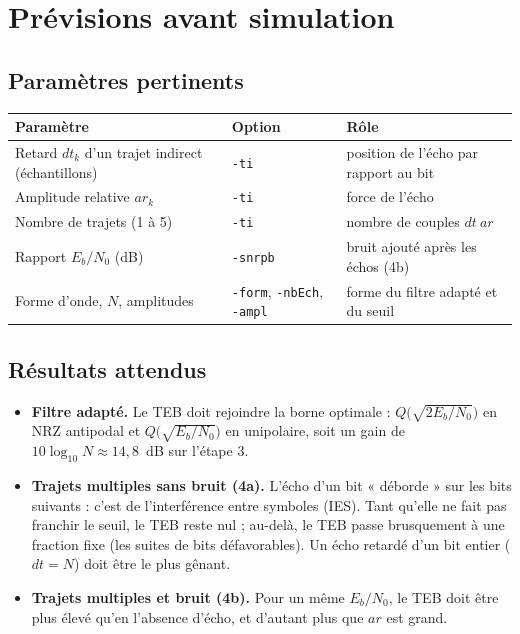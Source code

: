 \documentclass[11pt,a4paper]{article}
\newcommand{\EbNo}{E_b/N_0}
\begin{document}
\section{Prévisions avant simulation}
\subsection{Paramètres pertinents}
\begin{center}\begin{tabular}{lll}\toprule
Paramètre & Option & Rôle\\\midrule
Retard $dt_k$ d'un trajet indirect (échantillons) & \texttt{-ti} & position de l'écho par rapport au bit\\
Amplitude relative $ar_k$ & \texttt{-ti} & force de l'écho\\
Nombre de trajets (1 à 5) & \texttt{-ti} & nombre de couples $dt\ ar$\\
Rapport $\EbNo$ (dB) & \texttt{-snrpb} & bruit ajouté après les échos (4b)\\
Forme d'onde, $N$, amplitudes & \texttt{-form}, \texttt{-nbEch}, \texttt{-ampl} & forme du filtre adapté et du seuil\\\bottomrule
\end{tabular}\end{center}

\subsection{Résultats attendus}
\begin{itemize}
  \item \textbf{Filtre adapté.} Le TEB doit rejoindre la borne optimale : $Q\big(\sqrt{2\EbNo}\big)$ en NRZ antipodal et $Q\big(\sqrt{\EbNo}\big)$ en unipolaire, soit un gain de $10\log_{10}N \approx 14{,}8$~dB sur l'étape 3.
  \item \textbf{Trajets multiples sans bruit (4a).} L'écho d'un bit « déborde » sur les bits suivants : c'est de l'interférence entre symboles (IES). Tant qu'elle ne fait pas franchir le seuil, le TEB reste nul ; au-delà, le TEB passe brusquement à une fraction fixe (les suites de bits défavorables). Un écho retardé d'un bit entier ($dt = N$) doit être le plus gênant.
  \item \textbf{Trajets multiples et bruit (4b).} Pour un même $\EbNo$, le TEB doit être plus élevé qu'en l'absence d'écho, et d'autant plus que $ar$ est grand.
\end{itemize}
\end{document}
